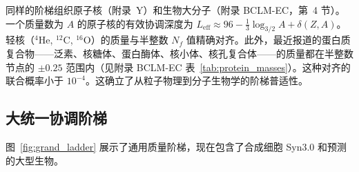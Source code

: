 \documentclass[11pt,a4paper]{article}
\begin{document}
	同样的阶梯组织原子核（附录~Y）和生物大分子（附录 BCLM-EC，第~4 节）。一个质量数为 \(A\) 的原子核的有效协调深度为 \(L_{\mathrm{eff}} \approx 96 - \frac13 \log_{3/2} A + \delta(Z,A)\)。轻核（\(^4\)He, \(^{12}\)C, \(^{16}\)O）的质量与半整数 \(N_f\) 值精确对齐。此外，最近报道的蛋白质复合物——泛素、核糖体、蛋白酶体、核小体、核孔复合体——的质量都在半整数节点的 \(\pm 0.25\) 范围内（见附录 BCLM-EC 表~\ref{tab:protein_masses}）。这种对齐的联合概率小于 \(10^{-4}\)。这确立了从粒子物理到分子生物学的阶梯普适性。
	
	\subsection{大统一协调阶梯}
	
	图~\ref{fig:grand_ladder} 展示了通用质量阶梯，现在包含了合成细胞 Syn3.0 和预测的大型生物。
	
\end{document}
